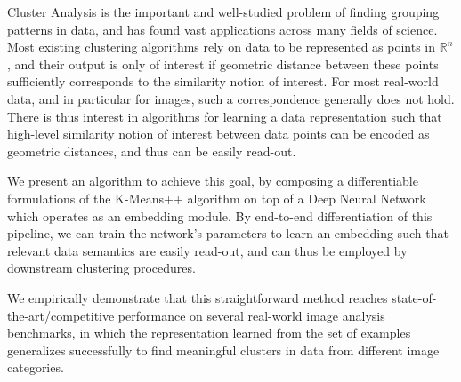 Cluster Analysis is the important and well-studied problem of finding grouping patterns in data, and has found vast applications across many fields of science.
Most existing clustering algorithms rely on data to be represented as points in $\mathbb{R}^n$, and their output is only of interest if geometric distance between these points sufficiently corresponds to the similarity notion of interest.
For most real-world data, and in particular for images, such a correspondence generally does not hold. There is thus interest in algorithms for learning a data representation such that high-level similarity notion of interest between data points can be encoded as geometric distances, and thus can be easily read-out.

We present an algorithm to achieve this goal, by composing a differentiable formulations of the K-Means++  algorithm on top of a Deep Neural Network which operates as an embedding module. By end-to-end differentiation of this pipeline, we can train the network's parameters to learn an embedding such that relevant data semantics are easily read-out, and can thus be employed by downstream clustering procedures.

We empirically demonstrate that this straightforward method reaches state-of-the-art/competitive performance on several real-world image analysis benchmarks, in which the representation learned from the set of examples generalizes successfully to find meaningful clusters in data from different image categories. 

